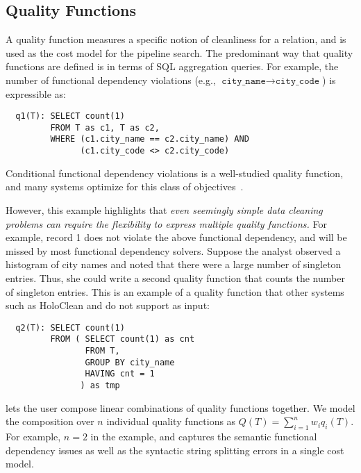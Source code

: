 


\subsection{Quality Functions}

A quality function measures a specific notion of cleanliness for a relation, and is used as the cost model for the pipeline search.  The predominant way that quality functions are defined is in terms of SQL aggregation queries. For example, the number of functional dependency violations (e.g., $\texttt{city\_name} \rightarrow \texttt{city\_code}$) is expressible as:
\begin{lstlisting}
  q1(T): SELECT count(1)
         FROM T as c1, T as c2,
         WHERE (c1.city_name == c2.city_name) AND
               (c1.city_code <> c2.city_code)
\end{lstlisting}
Conditional functional dependency violations is a well-studied quality function, and many systems optimize for this class of objectives~\cite{rekatsinas2017holoclean,DBLP:conf/sigmod/ChuIKW16}.   

However, this example highlights that \emph{even seemingly simple data cleaning problems can require the flexibility to express multiple quality functions.}   For example, record 1 does not violate the above functional dependency, and will be missed by most functional dependency solvers.  Suppose the analyst observed a histogram of city names and noted that there were a large number of singleton entries. Thus, she could write a second quality function that counts the number of singleton entries.  This is an example of a quality function that other systems such as HoloClean and  do not support as input:
\begin{lstlisting}
  q2(T): SELECT count(1)
         FROM ( SELECT count(1) as cnt
                FROM T,
                GROUP BY city_name 
                HAVING cnt = 1
               ) as tmp
\end{lstlisting}

\noindent \sys lets the user compose linear combinations of quality functions together. We model the composition over $n$ individual quality functions as $Q(T) = \sum_{i=1}^n w_iq_i(T)$.  For example, $n=2$ in the example, and captures the semantic functional dependency issues as well as the syntactic string splitting errors in a single cost model.

